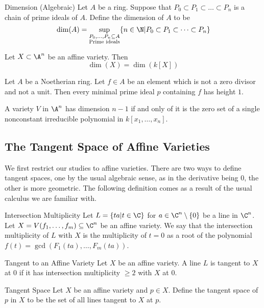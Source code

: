 \documentclass[a4paper]{article}
\begin{document}
\begin{defn}{Dimension (Algebraic)}{} Let $A$ be a ring. Suppose that $P_0\subset P_1\subset\dots\subset P_n$ is a chain of prime ideals of $A$. Define the dimension of $A$ to be $$\dim(A)=\sup_{\substack{P_0,\dots,P_n\subseteq A\\ \text{Prime ideals}}}\{n\in\N|P_0\subset P_1\subset\dots\subset P_n\}$$
\end{defn}

\begin{thm}{}{} Let $X\subset\A^n$ be an affine variety. Then $$\dim(X)=\dim(k[X])$$
\end{thm}

\begin{thm}{}{} Let $A$ be a Noetherian ring. Let $f\in A$ be an element which is not a zero divisor and not a unit. Then every minimal prime ideal $p$ containing $f$ has height $1$. 
\end{thm}

\begin{prp}{}{} A variety $V$ in $\A^n$ has dimension $n-1$ if and only of it is the zero set of a single nonconstant irreducible polynomial in $k[x_1,\dots,x_n]$. 
\end{prp}

\subsection{The Tangent Space of Affine Varieties}
We first restrict our studies to affine varieties. There are two ways to define tangent spaces, one by the usual algebraic sense, as in the derivative being $0$, the other is more geometric. The following definition comes as a result of the usual calculus we are familiar with. 


\begin{defn}{Intersection Multiplicity}{} Let $L=\{ta|t\in\C\}$ for $a\in\C^n\setminus\{0\}$ be a line in $\C^n$. Let $X=V(f_1,\dots,f_m)\subseteq\C^n$ be an affine variety. We say that the intersection multiplicity of $L$ with $X$ is the multiplicity of $t=0$ as a root of the polynomial $f(t)=\gcd(F_1(ta),\dots,F_m(ta))$. 
\end{defn}

\begin{defn}{Tangent to an Affine Variety}{} Let $X$ be an affine variety. A line $L$ is tangent to $X$ at $0$ if it has intersection multiplicity $\geq 2$ with $X$ at $0$. 
\end{defn}

\begin{defn}{Tangent Space}{} Let $X$ be an affine variety and $p\in X$. Define the tangent space of $p$ in $X$ to be the set of all lines tangent to $X$ at $p$. 
\end{defn}
\end{document}
